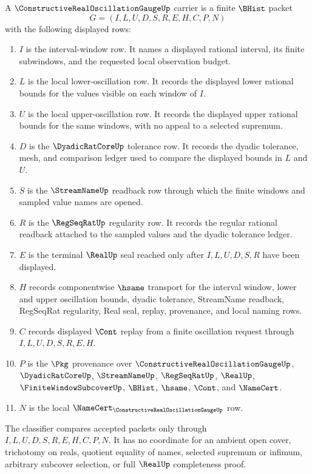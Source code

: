 \begin{definition}
\label{def:constructive-real-oscillation-gauge-carrier}
A $\ConstructiveRealOscillationGaugeUp$ carrier is a finite $\BHist$ packet
$$
G=(I,L,U,D,S,R,E,H,C,P,N)
$$
with the following displayed rows:
\begin{enumerate}
\item $I$ is the interval-window row. It names a displayed rational interval, its finite subwindows, and the requested local observation budget.
\item $L$ is the local lower-oscillation row. It records the displayed lower rational bounds for the values visible on each window of $I$.
\item $U$ is the local upper-oscillation row. It records the displayed upper rational bounds for the same windows, with no appeal to a selected supremum.
\item $D$ is the $\DyadicRatCoreUp$ tolerance row. It records the dyadic tolerance, mesh, and comparison ledger used to compare the displayed bounds in $L$ and $U$.
\item $S$ is the $\StreamNameUp$ readback row through which the finite windows and sampled value names are opened.
\item $R$ is the $\RegSeqRatUp$ regularity row. It records the regular rational readback attached to the sampled values and the dyadic tolerance ledger.
\item $E$ is the terminal $\RealUp$ seal reached only after $I,L,U,D,S,R$ have been displayed.
\item $H$ records componentwise $\hsame$ transport for the interval window, lower and upper oscillation bounds, dyadic tolerance, StreamName readback, RegSeqRat regularity, Real seal, replay, provenance, and local naming rows.
\item $C$ records displayed $\Cont$ replay from a finite oscillation request through $I,L,U,D,S,R,E,H$.
\item $P$ is the $\Pkg$ provenance over $\ConstructiveRealOscillationGaugeUp$, $\DyadicRatCoreUp$, $\StreamNameUp$, $\RegSeqRatUp$, $\RealUp$, $\FiniteWindowSubcoverUp$, $\BHist$, $\hsame$, $\Cont$, and $\NameCert$.
\item $N$ is the local $\NameCert_{\ConstructiveRealOscillationGaugeUp}$ row.
\end{enumerate}
The classifier compares accepted packets only through $I,L,U,D,S,R,E,H,C,P,N$. It has no coordinate for an ambient open cover, trichotomy on reals, quotient equality of names, selected supremum or infimum, arbitrary subcover selection, or full $\RealUp$ completeness proof.
\end{definition}

